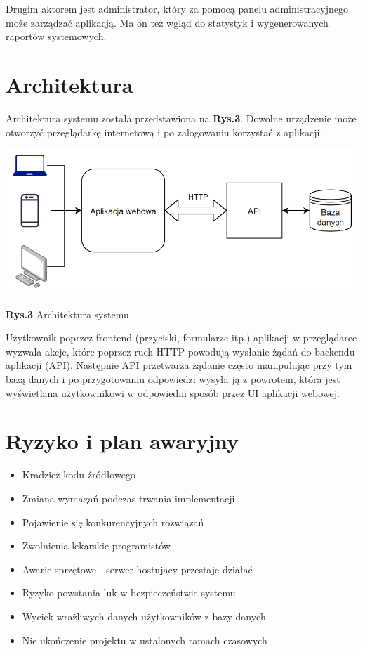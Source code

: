 \documentclass{article}
\begin{document}
 Drugim aktorem jest administrator, który za pomocą panelu administracyjnego może zarządzać aplikacją. Ma on też wgląd do statystyk i wygenerowanych raportów systemowych.

\section{Architektura}

Architektura systemu została przedstawiona na \textbf{Rys.3}. Dowolne urządzenie może otworzyć przeglądarkę internetową i po zalogowaniu korzystać z aplikacji.

\hspace*{-3cm}\includegraphics[scale=0.8]{architecture}
\begin{center}\textbf{Rys.3} Architektura systemu \end{center}

Użytkownik poprzez frontend (przyciski, formularze itp.) aplikacji w przeglądarce wyzwala akcje, które poprzez ruch HTTP powodują wysłanie żądań do backendu aplikacji (API). Następnie API przetwarza żądanie często manipulując przy tym bazą danych i po przygotowaniu odpowiedzi wysyła ją z powrotem, która jest wyświetlana użytkownikowi w odpowiedni sposób przez UI aplikacji webowej.


\section{Ryzyko i plan awaryjny}

\begin{itemize}
  \item Kradzież kodu źródłowego
  \item Zmiana wymagań podczas trwania implementacji
  \item Pojawienie się konkurencyjnych rozwiązań
  \item Zwolnienia lekarskie programistów
  \item Awarie sprzętowe - serwer hostujący przestaje działać
  \item Ryzyko powstania luk w bezpieczeństwie systemu
  \item Wyciek wrażliwych danych użytkowników z bazy danych
  \item Nie ukończenie projektu w ustalonych ramach czasowych
\end{itemize}
\end{document}

